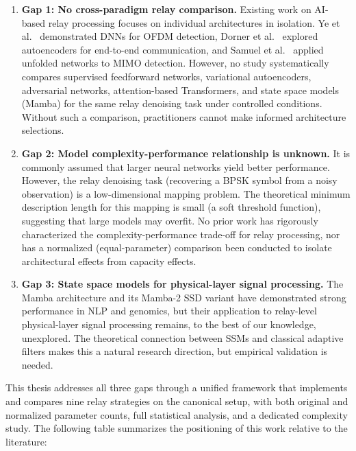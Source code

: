 \begin{enumerate}
    \item \textbf{Gap 1: No cross-paradigm relay comparison.} Existing work on AI-based relay processing focuses on individual architectures in isolation. Ye et al.~\cite{YeLiJuang2018OFDMDL} demonstrated DNNs for OFDM detection, Dorner et al.~\cite{Dorner2018OverTheAirDL} explored autoencoders for end-to-end communication, and Samuel et al.~\cite{SamuelDiskinWunder2019MIMODetect} applied unfolded networks to MIMO detection. However, no study systematically compares supervised feedforward networks, variational autoencoders, adversarial networks, attention-based Transformers, and state space models (Mamba) for the same relay denoising task under controlled conditions. Without such a comparison, practitioners cannot make informed architecture selections.
    \item \textbf{Gap 2: Model complexity-performance relationship is unknown.} It is commonly assumed that larger neural networks yield better performance. However, the relay denoising task (recovering a BPSK symbol from a noisy observation) is a low-dimensional mapping problem. The theoretical minimum description length for this mapping is small (a soft threshold function), suggesting that large models may overfit. No prior work has rigorously characterized the complexity-performance trade-off for relay processing, nor has a normalized (equal-parameter) comparison been conducted to isolate architectural effects from capacity effects.

    \item \textbf{Gap 3: State space models for physical-layer signal processing.} The Mamba architecture \cite{gu2023mamba} and its Mamba-2 SSD variant \cite{DaoGu2024TransformersSSM} have demonstrated strong performance in NLP and genomics, but their application to relay-level physical-layer signal processing remains, to the best of our knowledge, unexplored. The theoretical connection between SSMs and classical adaptive filters makes this a natural research direction, but empirical validation is needed.
\end{enumerate}

This thesis addresses all three gaps through a unified framework that implements and compares nine relay strategies on the canonical setup, with both original and normalized parameter counts, full statistical analysis, and a dedicated complexity study. The following table summarizes the positioning of this work relative to the literature:

